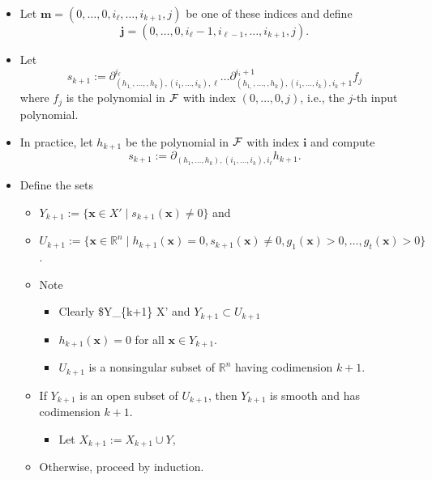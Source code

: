 \documentclass[
]{book}
\providecommand{\tightlist}{%
  \setlength{\itemsep}{0pt}\setlength{\parskip}{0pt}}
\theoremstyle{definition}
\theoremstyle{definition}
\theoremstyle{definition}
\theoremstyle{definition}
\theoremstyle{remark}
\begin{document}
\begin{itemize}
\begin{itemize}
    \begin{itemize}
    \item
      Let \(\mathbf{m} = (0,\ldots,0,i_\ell,\ldots,i_{k+1},j)\) be one of these indices and define
      \[
      \mathbf{j} = (0, \ldots, 0, i_{\ell} - 1, i_{\ell - 1}, \ldots, i_{k+1},j).
      \]
    \item
      Let
      \[
      s_{k+1} := \partial_{(h_{1,},\ldots,,h_{k}),(i_{1},\ldots,i_{k}),\ell}^{i_{\ell}}\ldots\partial_{(h_{1,},\ldots,,h_{k}),(i_{1},\ldots,i_{k}),i_{k}+1}^{i_{i}+1}f_{j}
      \]
      where \(f_j\) is the polynomial in \(\cal F\) with index \((0,\ldots,0,j)\), i.e., the \(j\)-th input polynomial.
    \item
      In practice, let \(h_{k+1}\) be the polynomial in \(\cal F\) with index \(\mathbf{i}\) and compute
      \[
      s_{k+1} := \partial_{(h_1,\ldots,h_k), (i_1,\ldots,i_k), i_\ell} h_{k+1}.
      \]
    \item
      Define the sets

      \begin{itemize}
      \item
        \(Y_{k+1} := \{ \mathbf{x} \in X' \mid s_{k+1}(\mathbf{x}) \ne 0 \}\) and
      \item
        \(U_{k+1} := \{ \mathbf{x} \in \mathbb{R}^n \mid h_{k+1}(\mathbf{x}) = 0, s_{k+1}(\mathbf{x}) \ne 0, g_1(\mathbf{x}) > 0 , \ldots, g_t(\mathbf{x}) > 0 \}\).
      \item
        Note

        \begin{itemize}
        \tightlist
        \item
          Clearly \$Y\_\{k+1\} \subset X' and \(Y_{k+1} \subset U_{k+1}\)
        \item
          \(h_{k+1}(\mathbf{x}) = 0\) for all \(\mathbf{x} \in Y_{k+1}\).
        \item
          \(U_{k+1}\) is a nonsingular subset of \(\mathbb{R}^n\) having codimension \(k+1\).
        \end{itemize}
      \item
        If \(Y_{k+1}\) is an open subset of \(U_{k+1}\), then \(Y_{k+1}\) is smooth and has codimension \(k+1\).

        \begin{itemize}
        \tightlist
        \item
          Let \(X_{k+1} := X_{k+1} \cup Y\),
        \end{itemize}
      \item
        Otherwise, proceed by induction.


\end{itemize}
\end{itemize}
\end{itemize}
\end{itemize}
\end{document}
